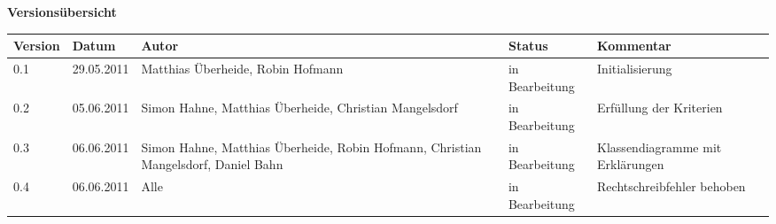 
{\textbf{Versionsübersicht}}\\[2ex]

\begin{longtable}{|m{1.78cm}|m{1.59cm}|m{2.86cm}|m{1.9cm}|m{5.25cm}|}

  \hline                                              %

  \textbf{Version}  &    \textbf{Datum}  &    \textbf{Autor}  &
  \textbf{Status}   &    \textbf{Kommentar}       \\  %
  \hline                                              %


  0.1   & 29.05.2011   &  Matthias Überheide, Robin Hofmann& in Bearbeitung &   Initialisierung\\      %
  \hline     
	0.2 & 05.06.2011 & Simon Hahne, Matthias Überheide, Christian Mangelsdorf & in Bearbeitung & Erfüllung der Kriterien\\
	\hline
	0.3 & 06.06.2011 & Simon Hahne, Matthias Überheide, Robin Hofmann, Christian Mangelsdorf, Daniel Bahn & in Bearbeitung & Klassendiagramme mit Erklärungen\\
	\hline
	0.4 & 06.06.2011 & Alle & in Bearbeitung & Rechtschreibfehler behoben\\
	\hline
																						

\end{longtable}
